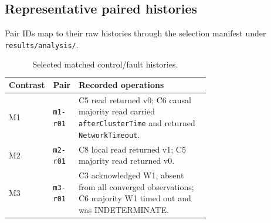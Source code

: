 \subsection{Representative paired histories}
\label{app:representative-histories}

Pair IDs map to their raw histories through the selection manifest under
\texttt{results/analysis/}.

\begin{table}[ht]
\centering
\small
\setlength{\tabcolsep}{4pt}
\caption{Selected matched control/fault histories.}
\label{tab:rq3-representative-histories}
\begin{tabular}{@{}l l p{0.68\linewidth}@{}}
\toprule
Contrast & Pair & Recorded operations \\
\midrule
M1 & \texttt{m1-r01} & C5 read returned v0; C6 causal majority read carried \texttt{afterClusterTime} and returned \texttt{NetworkTimeout}. \\
M2 & \texttt{m2-r01} & C8 local read returned v1; C5 majority read returned v0. \\
M3 & \texttt{m3-r01} & C3 acknowledged W1, absent from all converged observations; C6 majority W1 timed out and was INDETERMINATE. \\
\bottomrule
\end{tabular}
\end{table}
\FloatBarrier
